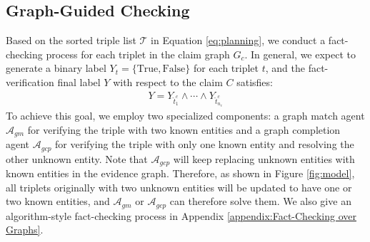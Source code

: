 \subsection{Graph-Guided Checking}\label{sec:Graph-Guided Checking}
Based on the sorted triple list $\mathcal{T}$ in Equation \ref{eq:planning}, we conduct a fact-checking process for each triplet in the claim graph $G_c$. In general, we expect to generate a binary label $Y_{t} =\{\text{True}, \text{False}\}$ for each triplet $t$, and the fact-verification final label $Y$ with respect to the claim $C$ satisfies:
\begin{align}
    Y = Y_{\hat{t}^c_1} \wedge \cdots \wedge Y_{\hat{t}^c_{n_c}}
\end{align}
To achieve this goal, we employ two specialized components: a graph match agent $\mathcal{A}_{gm}$ for verifying the triple with two known entities and a graph completion agent $\mathcal{A}_{gcp}$ for verifying the triple with only one known entity and resolving the other unknown entity. Note that $\mathcal{A}_{gcp}$ will keep replacing unknown entities with known entities in the evidence graph. Therefore, as shown in Figure \ref{fig:model}, all triplets originally with two unknown entities will be updated to have one or two known entities, and $\mathcal{A}_{gm}$ or $\mathcal{A}_{gcp}$ can therefore solve them. We also give an algorithm-style fact-checking process in Appendix \ref{appendix:Fact-Checking over Graphs}.



